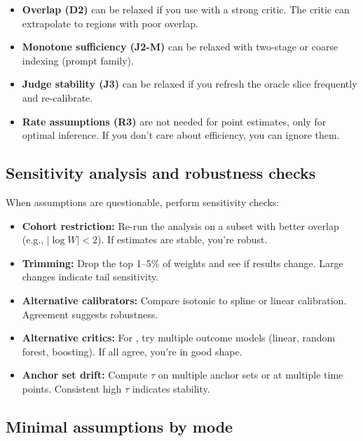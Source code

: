 \begin{itemize}
\item \textbf{Overlap (D2)} can be relaxed if you use \dr{} with a strong critic. The critic can extrapolate to regions with poor overlap.
\item \textbf{Monotone sufficiency (J2-M)} can be relaxed with two-stage \autocal{} or coarse indexing (prompt family).
\item \textbf{Judge stability (J3)} can be relaxed if you refresh the oracle slice frequently and re-calibrate.
\item \textbf{Rate assumptions (R3)} are not needed for point estimates, only for optimal inference. If you don't care about efficiency, you can ignore them.
\end{itemize}

\subsection{Sensitivity analysis and robustness checks}

When assumptions are questionable, perform sensitivity checks:

\begin{itemize}
\item \textbf{Cohort restriction:} Re-run the analysis on a subset with better overlap (e.g., $|\log W| < 2$). If estimates are stable, you're robust.
\item \textbf{Trimming:} Drop the top 1--5\% of weights and see if results change. Large changes indicate tail sensitivity.
\item \textbf{Alternative calibrators:} Compare isotonic \autocal{} to spline or linear calibration. Agreement suggests robustness.
\item \textbf{Alternative critics:} For \dr, try multiple outcome models (linear, random forest, boosting). If all agree, you're in good shape.
\item \textbf{Anchor set drift:} Compute $\tau$ on multiple anchor sets or at multiple time points. Consistent high $\tau$ indicates stability.
\end{itemize}

\subsection{Minimal assumptions by mode}

